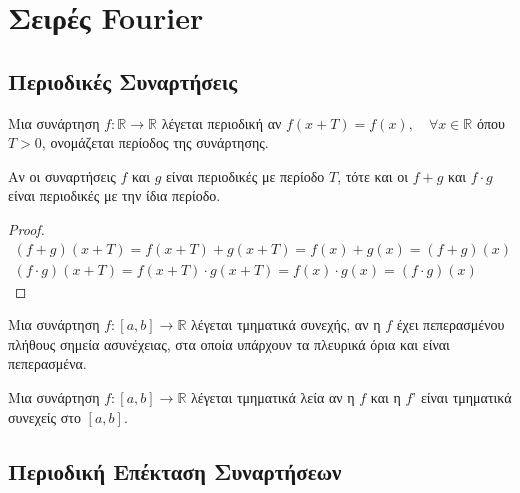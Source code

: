 



\pagestyle{vangelis}




\chapter{Σειρές Fourier}


\section{Περιοδικές Συναρτήσεις}

\vspace{\baselineskip}

\begin{dfn}
  Μια συνάρτηση $ f \colon \mathbb{R} \to \mathbb{R} $ λέγεται 
  \textcolor{Col1}{περιοδική} αν 
  $
  f(x+T)=f(x),\quad \forall x \in \mathbb{R} 
  $ 
  όπου $ T>0 $, ονομάζεται \textcolor{Col1}{περίοδος} της συνάρτησης.
\end{dfn}

\begin{prop}
  Αν οι συναρτήσεις $ f $ και $g$ είναι περιοδικές με περίοδο $T$, τότε και οι 
  $ f+g $ και $ f\cdot g $ είναι περιοδικές με την ίδια περίοδο.
\end{prop}
\begin{proof}
  \begin{align*}
    (f+g)(x+T) = f(x+T)+g(x+T)=f(x)+g(x)=(f+g)(x) \\
    (f\cdot g)(x+T) = f(x+T)\cdot g(x+T)=f(x)\cdot g(x)=(f\cdot g)(x) 
  \end{align*} 
\end{proof}

\begin{dfn}
  Μια συνάρτηση $ f \colon [a,b] \to \mathbb{R} $ λέγεται 
  \textcolor{Col1}{τμηματικά συνεχής}, αν η  $f$ έχει πεπερασμένου πλήθους 
  σημεία ασυνέχειας, στα οποία υπάρχουν τα πλευρικά όρια και είναι πεπερασμένα.
\end{dfn}

\begin{dfn}
  Μια συνάρτηση  $ f \colon [a,b] \to \mathbb{R} $  λέγεται  
  \textcolor{Col1}{τμηματικά λεία} αν η $f$ και η $f$' είναι τμηματικά συνεχείς 
  στο $ [a,b] $.     
\end{dfn}


\section{Περιοδική Επέκταση Συναρτήσεων}


